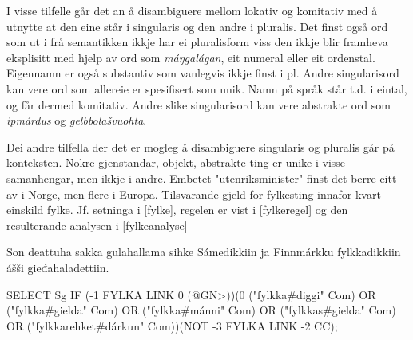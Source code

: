 \documentclass[a4paper,norsk]{article}
\begin{document}
I visse tilfelle  går det an å disambiguere mellom lokativ og komitativ med å utnytte at den eine står i singularis og den andre i pluralis. %
Det finst også ord som ut i frå semantikken ikkje har ei pluralisform viss den ikkje blir framheva eksplisitt med hjelp av ord som \textit{máŋgalágan}, eit numeral eller eit ordenstal. Eigennamn er også substantiv som vanlegvis ikkje finst i pl. Andre singularisord kan vere ord som allereie er spesifisert som unik. Namn på språk står t.d. i eintal, og får dermed komitativ. Andre slike singularisord kan vere abstrakte ord som \emph{ipmárdus} og \emph{gelbbolašvuohta}. %

Dei andre tilfella der det er mogleg å disambiguere singularis og pluralis går på konteksten. Nokre gjenstandar, objekt, abstrakte ting er unike i visse samanhengar, men ikkje i andre. Embetet "utenriksminister" finst det berre eitt av i Norge, men flere i Europa. Tilsvarande gjeld for fylkesting innafor kvart einskild fylke. Jf. setninga i \ref{fylke}, regelen er vist i \ref{fylkeregel} og den resulterande analysen i \ref{fylkeanalyse} %

\begin{example}\label{fylke}
Son deattuha sakka gulahallama sihke Sámedikkiin ja Finnmárkku fylkkadikkiin ášši gieđahaladettiin.
\end{example}

\begin{example}\label{fylkeregel}
SELECT Sg IF (-1 FYLKA LINK 0 (@GN>))(0 ("fylkka\#diggi" Com) OR ("fylkka\#gielda" Com) OR ("fylkka\#mánni" Com) OR ("fylkkas\#gielda" Com) OR ("fylkkarehket\#dárkun" Com))(NOT -3 FYLKA LINK -2 CC);
\end{example}
\end{document}
